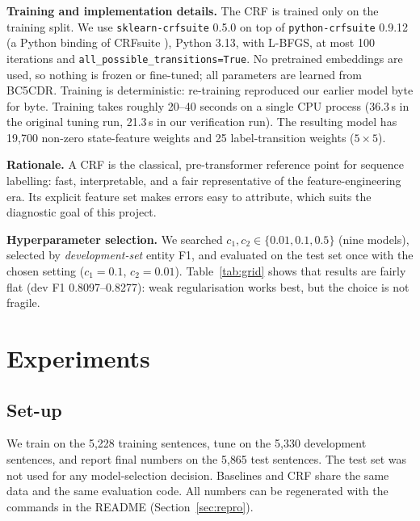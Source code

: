\documentclass[10pt,a4paper]{article}
\begin{document}
\textbf{Training and implementation details.} The CRF is trained only on the training split. We use \texttt{sklearn-crfsuite} 0.5.0 on top of \texttt{python-crfsuite} 0.9.12
(a Python binding of CRFsuite \cite{okazaki2007crfsuite}), Python 3.13, with L-BFGS, at most 100 iterations and \texttt{all\_possible\_transitions=True}.
No pretrained embeddings are used, so nothing is frozen or fine-tuned; all parameters are learned from BC5CDR.
Training is deterministic: re-training reproduced our earlier model byte for byte.
Training takes roughly 20--40 seconds on a single CPU process (36.3\,s in the original tuning run, 21.3\,s in our verification run).
The resulting model has 19{,}700 non-zero state-feature weights and 25 label-transition weights ($5\times5$).

\textbf{Rationale.} A CRF is the classical, pre-transformer reference point for sequence labelling: fast, interpretable, and a fair representative of the
feature-engineering era. Its explicit feature set makes errors easy to attribute, which suits the diagnostic goal of this project.

\textbf{Hyperparameter selection.} We searched $c_1,c_2\in\{0.01,0.1,0.5\}$ (nine models), selected by \emph{development-set} entity F1,
and evaluated on the test set once with the chosen setting ($c_1=0.1$, $c_2=0.01$). Table~\ref{tab:grid} shows that results are fairly flat (dev F1 0.8097--0.8277):
weak regularisation works best, but the choice is not fragile.



\section{Experiments}
\subsection{Set-up}
We train on the 5{,}228 training sentences, tune on the 5{,}330 development sentences, and report final numbers on the 5{,}865 test sentences.
The test set was not used for any model-selection decision. Baselines and CRF share the same data and the same evaluation code.
All numbers can be regenerated with the commands in the README (Section~\ref{sec:repro}).
\end{document}
